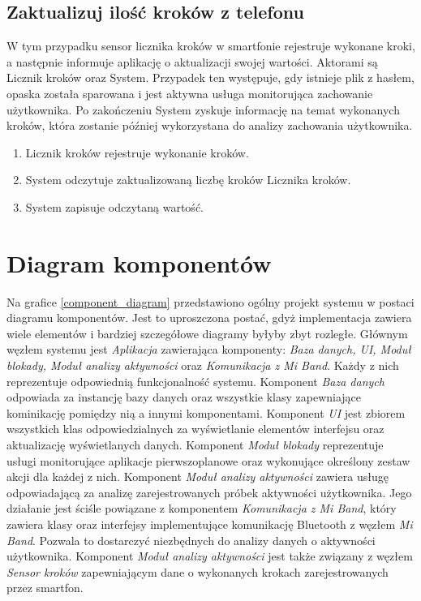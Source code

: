 \subsection{Zaktualizuj ilość kroków z telefonu}
W tym przypadku sensor licznika kroków w smartfonie rejestruje wykonane kroki, a następnie informuje aplikację o aktualizacji swojej wartości. Aktorami są Licznik kroków oraz System. Przypadek ten występuje, gdy istnieje plik z hasłem, opaska została sparowana i jest aktywna usługa monitorująca zachowanie użytkownika. Po zakończeniu System zyskuje informację na temat wykonanych kroków, która zostanie później wykorzystana do analizy zachowania użytkownika.
\begin{enumerate}
    \item Licznik kroków rejestruje wykonanie kroków.
    \item System odczytuje zaktualizowaną liczbę kroków Licznika kroków.
    \item System zapisuje odczytaną wartość.
\end{enumerate}

\section{Diagram komponentów}

Na grafice \ref{component_diagram} przedstawiono ogólny projekt systemu w postaci diagramu komponentów. Jest to uproszczona postać, gdyż implementacja zawiera wiele elementów i bardziej szczegółowe diagramy byłyby zbyt rozległe. Głównym węzłem systemu jest \textit{Aplikacja} zawierająca komponenty: \textit{Baza danych, UI, Moduł blokady, Moduł analizy aktywności} oraz \textit{Komunikacja z Mi Band}. Każdy z nich reprezentuje odpowiednią funkcjonalność systemu. 
\newline\newline
\indent Komponent \textit{Baza danych} odpowiada za instancję bazy danych oraz wszystkie klasy zapewniające kominikację pomiędzy nią a innymi komponentami. Komponent \textit{UI} jest zbiorem wszystkich klas odpowiedzialnych za wyświetlanie elementów interfejsu oraz aktualizację wyświetlanych danych. Komponent \textit{Moduł blokady} reprezentuje usługi monitorujące aplikacje pierwszoplanowe oraz wykonujące określony zestaw akcji dla każdej z nich. Komponent \textit{Moduł analizy aktywności} zawiera usługę odpowiadającą za analizę zarejestrowanych próbek aktywności użytkownika. Jego działanie jest ściśle powiązane z komponentem \textit{Komunikacja z Mi Band}, który zawiera klasy oraz interfejsy implementujące komunikację Bluetooth z węzłem \textit{Mi Band}. Pozwala to dostarczyć niezbędnych do analizy danych o aktywności użytkownika. Komponent \textit{Moduł analizy aktywności} jest także związany z węzłem \textit{Sensor kroków} zapewniającym dane o wykonanych krokach zarejestrowanych przez smartfon.

